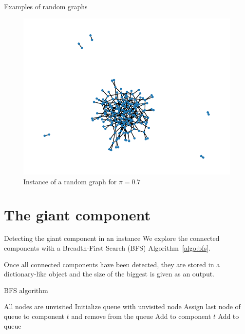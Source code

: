 \documentclass[handout]{beamer}
\begin{document}
\begin{frame}{Examples of random graphs}
    \begin{figure}
        \centering
        \includegraphics[height=.7\textheight]{rg2}
        \caption{Instance of a random graph for $\pi=0.7$}
        \label{fig:rg2}
    \end{figure}
\end{frame}

\section{The giant component}

\begin{frame}{Detecting the giant component in an instance}
    We explore the connected components with a \alert{Breadth-First Search}
    (BFS) Algorithm~\ref{algo:bfs}.

    Once all connected components have been detected, they are stored in a
    dictionary-like object and the size of the biggest is given as an output.
\end{frame}

\begin{frame}{BFS algorithm}
    \begin{algorithm}[H]
        \begin{algorithmic}[1]
            \STATE All nodes are unvisited
                \STATE Initialize queue with unvisited node
                    \STATE Assign last node of queue to component $t$
                    and remove from the queue
                            \STATE Add to component $t$
                            \STATE Add to queue
                        \ENDIF
                    \ENDFOR
                \ENDWHILE
            \ENDWHILE
        \end{algorithmic}
        \caption{Breadth-First Search algorithm implementation}
        \label{algo:bfs}
    \end{algorithm}
\end{frame}
\end{document}
